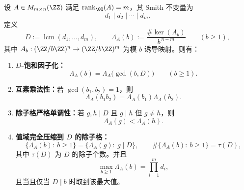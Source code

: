 \begin{conclusion}\label{con:xi-time-part62dgb-smith-d-saturation-divisor-embedding}
设 \(A\in M_{m\times n}(\ZZ)\) 满足 \(\operatorname{rank}_{\QQ}(A)=m\)，其 Smith 不变量为
\[
d_1\mid d_2\mid\cdots\mid d_m.
\]
定义
\[
D:=\operatorname{lcm}(d_1,\dots,d_m),
\qquad
\Lambda_A(b):=\frac{\#\ker(A_b)}{b^{\,n-m}}
\qquad(b\ge 1),
\]
其中 \(A_b:(\ZZ/b\ZZ)^n\to(\ZZ/b\ZZ)^m\) 为模 \(b\) 诱导映射。则有：
\begin{enumerate}
  \item \textbf{\(D\)-饱和因子化：}
  \[
  \Lambda_A(b)=\Lambda_A\bigl(\gcd(b,D)\bigr)
  \qquad(b\ge 1).
  \]
  \item \textbf{互素乘法性：}若 \(\gcd(b_1,b_2)=1\)，则
  \[
  \Lambda_A(b_1b_2)=\Lambda_A(b_1)\Lambda_A(b_2).
  \]
  \item \textbf{除子格严格单调性：}若 \(g,h\mid D\) 且 \(g\mid h\) 但 \(g\neq h\)，则
  \[
  \Lambda_A(g)<\Lambda_A(h).
  \]
  \item \textbf{值域完全压缩到 \(D\) 的除子格：}
  \[
  \{\Lambda_A(b):\ b\ge 1\}
  =
  \{\Lambda_A(g):\ g\mid D\},
  \qquad
  \#\{\Lambda_A(b):\ b\ge 1\}=\tau(D),
  \]
  其中 \(\tau(D)\) 为 \(D\) 的除子个数。并且
  \[
  \max_{b\ge 1}\Lambda_A(b)=\prod_{i=1}^{m}d_i,
  \]
  且当且仅当 \(D\mid b\) 时取到该最大值。
\end{enumerate}
\end{conclusion}
